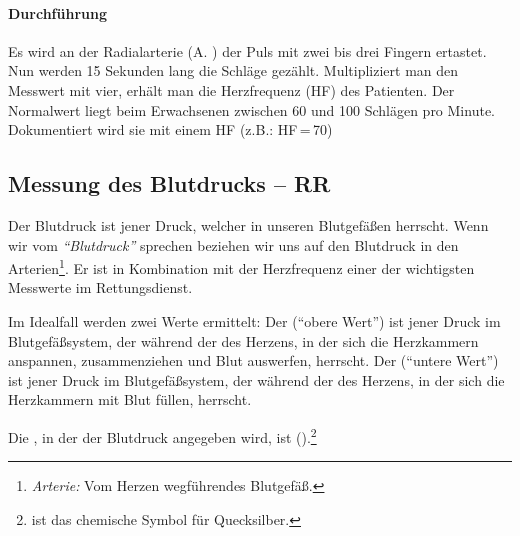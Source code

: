 \paragraph{Durchführung}

Es wird an der Radialarterie (A. ) der Puls mit
zwei bis drei Fingern ertastet. Nun werden 15 Sekunden lang
die Schläge gezählt. Multipliziert man den Messwert mit vier, erhält man  die Herzfrequenz (HF) des Patienten. Der Normalwert liegt beim Erwachsenen zwischen 60 und 100 Schlägen pro Minute.
Dokumentiert wird sie mit einem HF (z.B.: HF\,=\,70)

\subsection{Messung des Blutdrucks -- RR}
\label{topic:blutdruckmessung}

Der Blutdruck ist jener Druck, welcher in unseren Blutgefäßen
herrscht. Wenn wir vom \emph{"`Blutdruck"'} sprechen beziehen wir
uns auf den Blutdruck in den
Arterien\footnote{\emph{Arterie:} Vom Herzen wegführendes
Blutgefäß.}. Er ist in Kombination mit der Herzfrequenz
einer der wichtigsten Messwerte im
Rettungsdienst.

Im Idealfall werden zwei Werte ermittelt: Der
 ("`obere Wert"') ist jener Druck im
Blutgefäßsystem, der  während der  des Herzens, in der sich
die Herzkammern anspannen, zusammenziehen und Blut auswerfen, herrscht. Der
 ("`untere Wert"') ist jener Druck im
Blutgefäßsystem, der während der  des Herzens,
in der sich die Herzkammern mit
Blut füllen, herrscht. 

Die , in der der Blutdruck angegeben wird, ist
().\footnote{ ist
das chemische Symbol für Quecksilber.}


